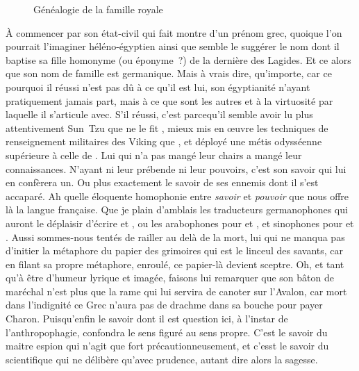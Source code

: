 \begin{figure}[h]
	\centering
	\caption{Généalogie de la famille royale}
\end{figure}
À commencer par son état-civil qui fait montre d’un prénom grec, quoique l’on pourrait l’imaginer héléno-égyptien ainsi que semble le suggérer le nom dont il baptise sa fille homonyme (ou éponyme ?) de la dernière des Lagides. Et ce alors que son nom de famille est germanique. Mais à vrais dire, qu’importe, car ce pourquoi il réussi n’est pas dû à ce qu’il est lui, son égyptianité n’ayant pratiquement jamais part, mais à ce que sont les autres et à la virtuosité par laquelle il s’articule avec. S’il réussi, c’est parcequ’il semble avoir lu plus attentivement Sun~Tzu que ne le fit \reine, mieux mis en œuvre les techniques de renseignement militaires des Viking que \princesse, et déployé une métis odysséenne supérieure à celle de \general. Lui qui n’a pas mangé leur chairs a mangé leur connaissances. N’ayant ni leur prébende ni leur pouvoirs, c’est son savoir qui lui en confèrera un. Ou plus exactement le savoir de ses ennemis dont il s’est accaparé. Ah quelle éloquente homophonie entre \emph{savoir} et \emph{pouvoir} que nous offre là la langue française. Que je plain d’amblais les traducteurs germanophones qui auront le déplaisir d’écrire  et , ou les arabophones pour  et , et sinophones pour  et .
Aussi sommes-nous tentés de railler \general{} au delà de la mort, lui qui ne manqua pas d’initier la métaphore du papier des grimoires qui est le linceul des savants, car en filant sa propre métaphore, enroulé, ce papier-là devient sceptre. Oh, et tant qu’à être d’humeur lyrique et imagée, faisons lui remarquer que son bâton de maréchal n’est plus que la rame qui lui servira de canoter sur l’Avalon, car mort dans l’indignité ce Grec n’aura pas de drachme dans sa bouche pour payer Charon. %
Puisqu’enfin le {savoir} dont il est question ici, à l’instar de l’anthropophagie, confondra le sens figuré au sens propre. C’est le savoir du maitre espion qui n’agit que fort précautionneusement, et c’esst le savoir du scientifique qui ne délibère qu’avec prudence, autant dire alors la sagesse.

